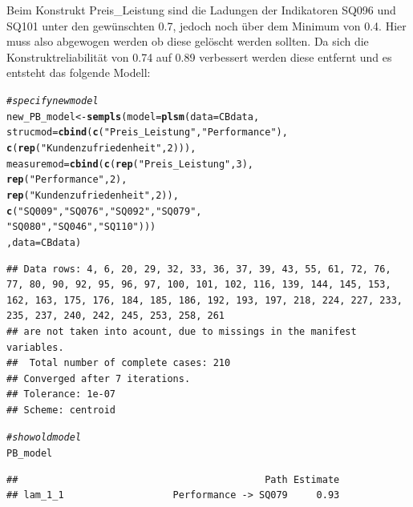 \documentclass{article}\usepackage[]{graphicx}\usepackage[]{color}
\makeatletter
\newcommand{\hlnum}[1]{\textcolor[rgb]{0.686,0.059,0.569}{#1}}%
\newcommand{\hlstr}[1]{\textcolor[rgb]{0.192,0.494,0.8}{#1}}%
\newcommand{\hlcom}[1]{\textcolor[rgb]{0.678,0.584,0.686}{\textit{#1}}}%
\newcommand{\hlstd}[1]{\textcolor[rgb]{0.345,0.345,0.345}{#1}}%
\newcommand{\hlkwb}[1]{\textcolor[rgb]{0.69,0.353,0.396}{#1}}%
\newcommand{\hlkwc}[1]{\textcolor[rgb]{0.333,0.667,0.333}{#1}}%
\newcommand{\hlkwd}[1]{\textcolor[rgb]{0.737,0.353,0.396}{\textbf{#1}}}%
\newenvironment{kframe}{%
 \def\at@end@of@kframe{}%
 \ifinner\ifhmode%
  \def\at@end@of@kframe{\end{minipage}}%
  \begin{minipage}{\columnwidth}%
 \fi\fi%
 \def\FrameCommand##1{\hskip\@totalleftmargin \hskip-\fboxsep
 \colorbox{shadecolor}{##1}\hskip-\fboxsep
     \hskip-\linewidth \hskip-\@totalleftmargin \hskip\columnwidth}%
 \MakeFramed {\advance\hsize-\width
   \@totalleftmargin\z@ \linewidth\hsize
   \@setminipage}}%
 {\par\unskip\endMakeFramed%
 \at@end@of@kframe}
\newenvironment{knitrout}{}{} %
\makeatother
\begin{document}
Beim Konstrukt Preis\_Leistung sind die Ladungen der Indikatoren SQ096 und SQ101 unter den gewünschten 0.7, jedoch noch über dem Minimum von 0.4. Hier muss also abgewogen werden ob diese gelöscht werden sollten. Da sich die Konstruktreliabilität von 0.74 auf 0.89 verbessert werden diese entfernt und es entsteht das folgende Modell: 
\begin{knitrout}
\color{fgcolor}\begin{kframe}
\begin{alltt}
\hlcom{#specify new model}
\hlstd{new_PB_model} \hlkwb{<-} \hlkwd{sempls}\hlstd{(}\hlkwc{model} \hlstd{=} \hlkwd{plsm}\hlstd{(}\hlkwc{data} \hlstd{= CBdata,}
                \hlkwc{strucmod} \hlstd{=} \hlkwd{cbind}\hlstd{(}\hlkwd{c}\hlstd{(}\hlstr{"Preis_Leistung"}\hlstd{,}\hlstr{"Performance"}\hlstd{),}
                                 \hlkwd{c}\hlstd{(}\hlkwd{rep}\hlstd{(}\hlstr{"Kundenzufriedenheit"}\hlstd{,}\hlnum{2}\hlstd{))),}
                \hlkwc{measuremod} \hlstd{=} \hlkwd{cbind}\hlstd{(}\hlkwd{c}\hlstd{(}\hlkwd{rep}\hlstd{(}\hlstr{"Preis_Leistung"}\hlstd{,}\hlnum{3}\hlstd{),}
                                     \hlkwd{rep}\hlstd{(}\hlstr{"Performance"}\hlstd{,}\hlnum{2}\hlstd{),}
                                     \hlkwd{rep}\hlstd{(}\hlstr{"Kundenzufriedenheit"}\hlstd{,}\hlnum{2}\hlstd{)),}
                                   \hlkwd{c}\hlstd{(}\hlstr{"SQ009"}\hlstd{,}\hlstr{"SQ076"}\hlstd{,}\hlstr{"SQ092"}\hlstd{,}\hlstr{"SQ079"}\hlstd{,}
                                     \hlstr{"SQ080"}\hlstd{,}\hlstr{"SQ046"}\hlstd{,}\hlstr{"SQ110"}\hlstd{)))}
                \hlstd{,}\hlkwc{data} \hlstd{= CBdata)}
\end{alltt}
\begin{verbatim}
## Data rows: 4, 6, 20, 29, 32, 33, 36, 37, 39, 43, 55, 61, 72, 76, 77, 80, 90, 92, 95, 96, 97, 100, 101, 102, 116, 139, 144, 145, 153, 162, 163, 175, 176, 184, 185, 186, 192, 193, 197, 218, 224, 227, 233, 235, 237, 240, 242, 245, 253, 258, 261 
## are not taken into acount, due to missings in the manifest variables.
##  Total number of complete cases: 210 
## Converged after 7 iterations.
## Tolerance: 1e-07
## Scheme: centroid
\end{verbatim}
\begin{alltt}
\hlcom{#show old model}
\hlstd{PB_model}
\end{alltt}
\begin{verbatim}
##                                           Path Estimate
## lam_1_1                   Performance -> SQ079     0.93

\end{verbatim}
\end{kframe}
\end{knitrout}
\end{document}
